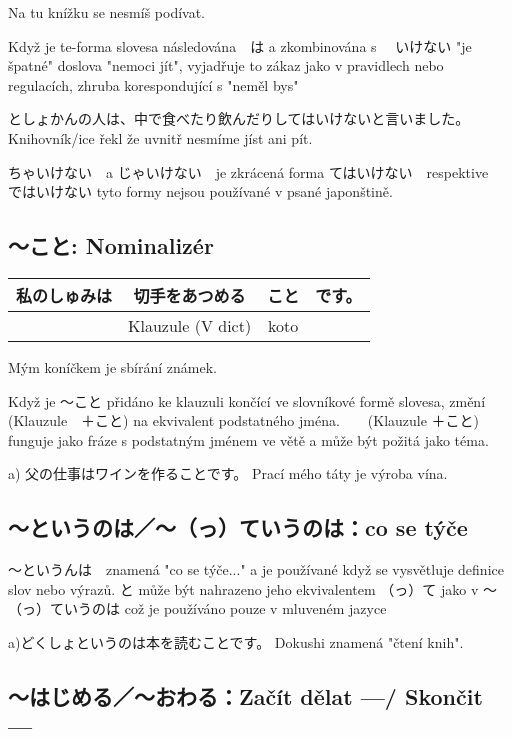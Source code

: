 Na tu knížku se nesmíš podívat.

Když je te-forma slovesa následována　は a zkombinována s 　いけない "je špatné" doslova "nemoci jít", vyjadřuje to zákaz jako v pravidlech nebo regulacích, zhruba korespondující s "neměl bys"

としょかんの人は、中で食べたり飲んだりしてはいけないと言いました。Knihovník/ice řekl že uvnitř nesmíme jíst ani pít.

ちゃいけない　a じゃいけない　je zkrácená forma てはいけない　respektive　ではいけない tyto formy nejsou používané v psané japonštině.

\subsection{〜こと: Nominalizér}

\begin{center}
\begin{tabular}{||c||c|c|c||}
\hline
私のしゅみは&切手をあつめる&こと&です。\\
\hline
&Klauzule (V dict)&koto&\\
\hline
\end{tabular}
\end{center}
Mým koníčkem je sbírání známek.

Když je 〜こと přidáno ke klauzuli končící ve slovníkové formě slovesa, změní (Klauzule　＋こと) na ekvivalent podstatného jména.　　(Klauzule ＋こと) funguje jako fráze s podstatným jménem ve větě a může být požitá jako téma.


a) 父の仕事はワインを作ることです。 Prací mého táty je výroba vína. 


\subsection{〜というのは／〜（っ）ていうのは：co se týče}

〜というんは　znamená "co se týče..." a je používané když se vysvětluje definice slov nebo výrazů. と může být nahrazeno jeho ekvivalentem （っ）て jako v  〜（っ）ていうのは což je používáno pouze v mluveném jazyce

a)どくしょというのは本を読むことです。 Dokushi znamená "čtení knih".


\subsection{〜はじめる／〜おわる：Začít dělat ---/ Skončit ---}

